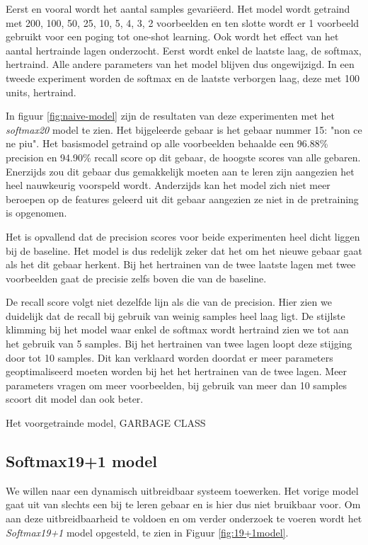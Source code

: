 \npar Eerst en vooral wordt het aantal samples gevari\"eerd. Het model wordt getraind met 200, 100, 50, 25, 10, 5, 4, 3, 2 voorbeelden en ten slotte wordt er 1 voorbeeld gebruikt voor een poging tot one-shot learning.
\npar Ook wordt het effect van het aantal hertrainde lagen onderzocht. Eerst wordt enkel de laatste laag, de softmax, hertraind. Alle andere parameters van het model blijven dus ongewijzigd. In een tweede experiment worden de softmax en de laatste verborgen laag, deze met 100 units, hertraind.

\npar In figuur \ref{fig:naive-model} zijn de resultaten van deze experimenten met het \textit{softmax20} model te zien. Het bijgeleerde gebaar is het gebaar nummer 15: "non ce ne piu". Het basismodel getraind op alle voorbeelden behaalde een 96.88\% precision en 94.90\% recall score op dit gebaar, de hoogste scores van alle gebaren. Enerzijds zou dit gebaar dus gemakkelijk moeten aan te leren zijn aangezien het heel nauwkeurig voorspeld wordt. Anderzijds kan het model zich niet meer beroepen op de features geleerd uit dit gebaar aangezien ze niet in de pretraining is opgenomen.

\npar Het is opvallend dat de precision scores voor beide experimenten heel dicht liggen bij de baseline. Het model is dus redelijk zeker dat het om het nieuwe gebaar gaat als het dit gebaar herkent. Bij het hertrainen van de twee laatste lagen met twee voorbeelden gaat de precisie zelfs boven die van de baseline.

\npar De recall score volgt niet dezelfde lijn als die van de precision. Hier zien we duidelijk dat de recall bij gebruik van weinig samples heel laag ligt. De stijlste klimming bij het model waar enkel de softmax wordt hertraind zien we tot aan het gebruik van 5 samples. Bij het hertrainen van twee lagen loopt deze stijging door tot 10 samples. Dit kan verklaard worden doordat er meer parameters geoptimaliseerd moeten worden bij het het hertrainen van de twee lagen. Meer parameters vragen om meer voorbeelden, bij gebruik van meer dan 10 samples scoort dit model dan  ook beter.

\npar Het voorgetrainde model, GARBAGE CLASS


\subsection{Softmax19+1 model}\label{sec:softmax19x1}
We willen naar een dynamisch uitbreidbaar systeem toewerken. Het vorige model gaat uit van slechts een bij te leren gebaar en is hier dus niet bruikbaar voor. Om aan deze uitbreidbaarheid te voldoen en om verder onderzoek te voeren wordt het \textit{Softmax19+1} model opgesteld, te zien in Figuur \ref{fig:19+1model}.

